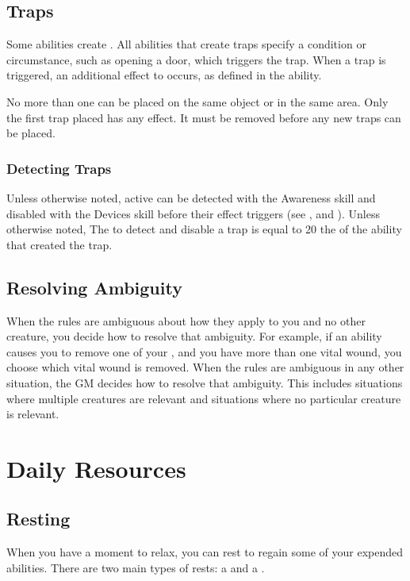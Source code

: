     \subsection{Traps}\label{Traps}
        Some abilities create .
        All abilities that create traps specify a condition or circumstance, such as opening a door, which triggers the trap.
        When a trap is triggered, an additional effect to occurs, as defined in the ability.

        No more than one  can be placed on the same object or in the same area.
        Only the first trap placed has any effect.
        It must be removed before any new traps can be placed.

        \subsubsection{Detecting Traps}\label{Detecting Traps}
            Unless otherwise noted, active  can be detected with the Awareness skill and disabled with the Devices skill before their effect triggers (see , and ).
            Unless otherwise noted, The  to detect and disable a trap is equal to 20 \add the  of the ability that created the trap.

    \subsection{Resolving Ambiguity}\label{Resolving Ambiguity}
        When the rules are ambiguous about how they apply to you and no other creature, you decide how to resolve that ambiguity.
        For example, if an ability causes you to remove one of your , and you have more than one vital wound, you choose which vital wound is removed.
        When the rules are ambiguous in any other situation, the GM decides how to resolve that ambiguity.
        This includes situations where multiple creatures are relevant and situations where no particular creature is relevant.

\section{Daily Resources}

    \subsection{Resting}\label{Resting}
        When you have a moment to relax, you can rest to regain some of your expended abilities.
        There are two main types of rests: a  and a .

